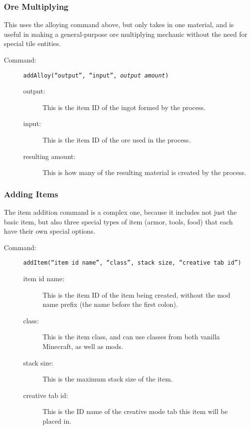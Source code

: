 \documentclass[letterpaper,titlepage,12pt]{article}
\begin{document}
\subsubsection{Ore Multiplying}

This uses the alloying command above, but only takes in one material, and is useful in making a general-purpose ore multiplying mechanic without the need for special tile entities.

\begin{description}
\item[Command:] \texttt{addAlloy(``\emph{output}'', ``\emph{input}'', \emph{output amount})}
\begin{description}
\item [output:] This is the item ID of the ingot formed by the process.
\item [input:] This is the item ID of the ore used in the process.
\item [resulting amount:] This is how many of the resulting material is created by the process.
\end{description}
\end{description}

\subsubsection{Adding Items}

The item addition command is a complex one, because it includes not just the basic item, but also three special types of item (armor, tools, food) that each have their own special options.  

\begin{description}
\item[Command:] \texttt{addItem(``item id name'', ``class'', stack size, ``creative tab id'')}
\begin{description}
\item [item id name:] This is the item ID of the item being created, without the mod name prefix (the name before the first colon).
\item [class:] This is the item class, and can use classes from both vanilla Minecraft, as well as mods.
\item [stack size:] This is the maximum stack size of the item.
\item [creative tab id:] This is the ID name of the creative mode tab this item will be placed in.
\end{description}
\end{description}
\end{document}
